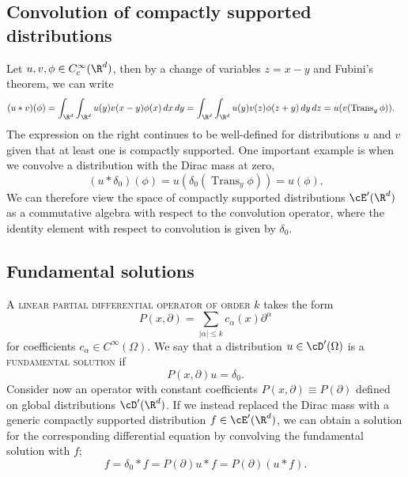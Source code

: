 \documentclass[reqno]{amsart}
\theoremstyle{definition}
\theoremstyle{remark}
\renewcommand{\emph}{\textsc}
\begin{document}
\subsection{Convolution of compactly supported distributions}

Let $u, v, \phi \in C^\infty_c (\R^d)$, then by a change of variables $z = x - y$ and Fubini's theorem, we can write
\begin{align*}
	(u * v)(\phi)
			&= \int_{\R^d} \int_{\R^d} u(y) v(x - y) \phi(x) \, dx \, dy = \int_{\R^d} \int_{\R^d} u(y) v(z) \phi(z + y) \, dy \, dz = u (v (\operatorname{Trans}_y \phi)).
\end{align*}
The expression on the right continues to be well-defined for distributions $u$ and $v$ given that at least one is compactly supported. One important example is when we convolve a distribution with the Dirac mass at zero, 
	\[ (u * \delta_0)(\phi) = u(\delta_0 (\operatorname{Trans}_y \phi)) = u (\phi). \]
We can therefore view the space of compactly supported distributions $\cE' (\R^d)$ as a commutative algebra with respect to the convolution operator, where the identity element with respect to convolution is given by $\delta_0$.


\subsection{Fundamental solutions}

A \emph{linear partial differential operator of order $k$} takes the form 
	\[ P(x, \partial) = \sum_{|\alpha| \leq k} c_\alpha (x) \partial^\alpha \]
for coefficients $c_\alpha \in C^\infty (\Omega)$. We say that a distribution $u \in \cD' (\Omega)$ is a \emph{fundamental solution} if
	\[ P(x, \partial) u = \delta_0. \]
Consider now an operator with constant coefficients $P(x, \partial) \equiv P(\partial)$ defined on global distributions $\cD' (\R^d)$. If we instead replaced the Dirac mass with a generic compactly supported distribution $f \in \cE' (\R^d)$, we can obtain a solution for the corresponding differential equation by convolving the fundamental solution with $f$;
	\[ f = \delta_0 * f = P(\partial) u * f = P(\partial) (u * f). \]
	
\end{document}
